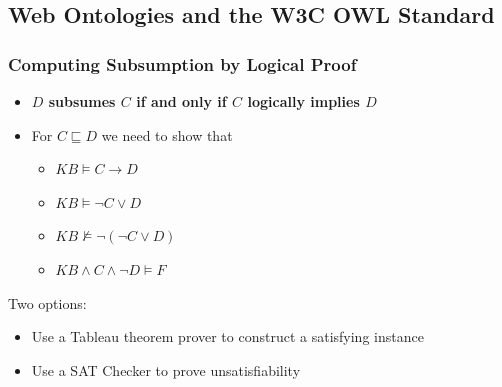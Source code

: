 \documentclass[conference, a4paper]{styles/acmsiggraph}
\begin{document}
    
    \subsection{Web Ontologies and the W3C OWL Standard}
    
    
    
    
    
    
    
    
        \subsubsection{Computing Subsumption by Logical Proof}
            \begin{itemize}
                \item \textbf{$D$ subsumes $C$ if and only if $C$ logically implies $D$}
                \item For $C \sqsubseteq D$ we need to show that
                    \begin{itemize}
                        \item $KB \vDash C \rightarrow D$
                        \item $KB \vDash \lnot C \vee D$
                        \item $KB \nvDash \lnot (\lnot C \vee D)$
                        \item $KB \wedge C \wedge \lnot D \vDash F$
                    \end{itemize}
            \end{itemize}
            Two options:
            \begin{itemize}
                \item Use a Tableau theorem prover to construct a satisfying instance
                \item Use a SAT Checker to prove unsatisfiability
            \end{itemize}
        
\end{document}
